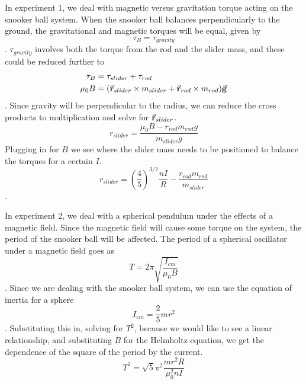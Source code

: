 \documentclass[aps,prl,10pt,twocolumn,floatfix]{revtex4-2}
\begin{document}
In experiment 1, we deal with magnetic versus gravitation torque acting on the snooker ball system.
When the snooker ball balances perpendicularly to the ground, the gravitational and magnetic torques will be equal, given by
\begin{equation*}
    \tau_{B}=\tau_{gravity}
\end{equation*}.
$\tau_{gravity}$ involves both the torque from the rod and the slider mass, and these could be reduced further to
\begin{align*}
    \tau_{B}&=\tau_{slider}+\tau_{rod}\\
    \mu_0 B&=(\va{r}_{slider}\times m_{slider}+\va{r}_{rod}\times m_{rod})\va{g}
\end{align*}.
Since gravity will be perpendicular to the radius, we can reduce the cross products to multiplication and solve for $\va{r}_{slider}$.
\begin{equation*}
    r_{slider}=\frac{\mu_0 B-r_{rod}m_{rod}g}{m_{slider}g}
\end{equation*}
Plugging in for $B$ we see where the slider mass needs to be positioned to balance the torques for a certain $I$.
\begin{equation}
    r_{slider}=\left(\frac{4}{5}\right) ^{3/2} \frac{nI}{R}-\frac{r_{rod}m_{rod}}{m_{slider}}
\end{equation}.

In experiment 2, we deal with a spherical pendulum under the effects of a magnetic field. 
Since the magnetic field will cause some torque on the system, the period of the snooker ball will be affected.
The period of a spherical oscillator under a magnetic field goes as
\begin{equation*}
    T=2\pi\sqrt{\frac{I_{cm}}{\mu_0 B}}
\end{equation*}.
Since we are dealing with the snooker ball system, we can use the equation of inertia for a sphere
\begin{equation*}
    I_{cm}=\frac{2}{5}mr^2
\end{equation*}.
Substituting this in, solving for $T^2$, because we would like to see a linear relationship, and substituting $B$ for the Helmholtz equation, we get the dependence of the square of the period by the current.
\begin{equation}
    T^2=\sqrt{5}\pi^2\frac{mr^2R}{\mu_0^2nI}
\end{equation}
\end{document}
